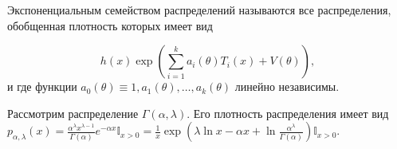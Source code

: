 \begin{definition}
Экспоненциальным семейством распределений называются все распределения, обобщенная плотность которых имеет вид


\begin{equation*}
h( x)\exp\left(\sum _{i=1}^{k} a_{i}( \theta ) T_{i}( x) +V( \theta )\right) ,
\end{equation*}
и где функции $\displaystyle a_{0}( \theta ) \equiv 1,a_{1}( \theta ) ,\dotsc ,a_{k}( \theta )$ линейно независимы.
\end{definition}
\begin{example}
Рассмотрим распределение $\displaystyle \Gamma ( \alpha ,\lambda )$. Его плотность распределения имеет вид $\displaystyle p_{\alpha ,\lambda }( x) =\frac{\alpha ^{\lambda } x^{\lambda -1}}{\Gamma ( \alpha )} e^{-\alpha x}\mathbb{I}_{x >0} =\frac{1}{x}\exp\left( \lambda \ln x-\alpha x+\ln\frac{\alpha ^{\lambda }}{\Gamma ( \alpha )}\right)\mathbb{I}_{x >0}$.
\end{example}